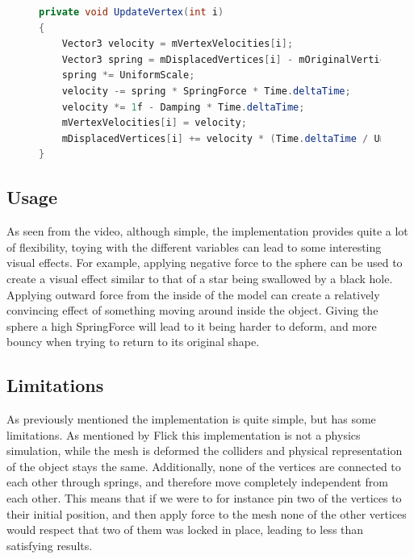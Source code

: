 \begin{figure}
\begin{lstlisting}[label={code:catlike_mesh_deformation_update},language=csharp,caption={Catlike coding mesh deformation vertex update}]
private void UpdateVertex(int i)
{
    Vector3 velocity = mVertexVelocities[i];
    Vector3 spring = mDisplacedVertices[i] - mOriginalVertices[i];
    spring *= UniformScale;
    velocity -= spring * SpringForce * Time.deltaTime;
    velocity *= 1f - Damping * Time.deltaTime;
    mVertexVelocities[i] = velocity;
    mDisplacedVertices[i] += velocity * (Time.deltaTime / UniformScale);
}
\end{lstlisting}
\end{figure}

\subsection{Usage}
As seen from the video, although simple, the implementation provides quite a lot of flexibility, toying with the different variables
can lead to some interesting visual effects.
For example, applying negative force to the sphere can be used to create a visual effect similar to that of a star being swallowed by a black hole.
Applying outward force from the inside of the model can create a relatively convincing effect of something moving around inside the object.
Giving the sphere a high SpringForce will lead to it being harder to deform, and more bouncy when trying to return to its original shape.

\subsection{Limitations}
As previously mentioned the implementation is quite simple, but has some limitations.
As mentioned by Flick\cite{catlike_mesh_deformation} this implementation is not a physics simulation, while the mesh is deformed
the colliders and physical representation of the object stays the same.
Additionally, none of the vertices are connected to each other through springs, and therefore move completely independent from each other.
This means that if we were to for instance pin two of the vertices to their initial position, and then apply force to the mesh
none of the other vertices would respect that two of them was locked in place, leading to less than satisfying results.




